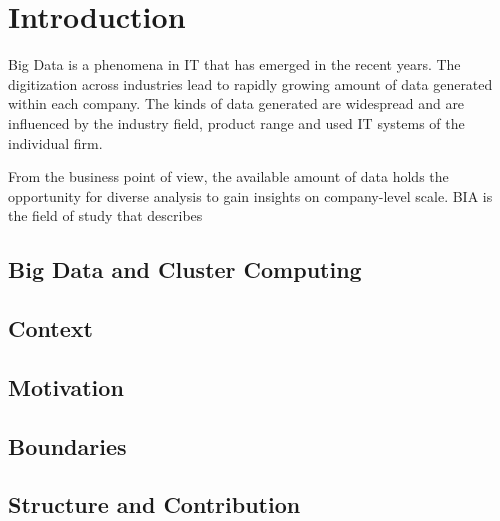 \chapter{Introduction}

Big Data is a phenomena in \ac{IT} that has emerged in the recent years.
The digitization across industries lead to rapidly growing amount of data generated
within each company.
The kinds of data generated are widespread 
and are influenced by the industry field, product range and used \ac{IT} systems 
of the individual firm.

From the business point of view, the available amount of data 
holds the opportunity for diverse analysis to gain insights on company-level scale.
\ac{BIA} is the field of study that describes 

\section{Big Data and Cluster Computing}

\section{Context}

\section{Motivation}

\section{Boundaries}

\section{Structure and Contribution}